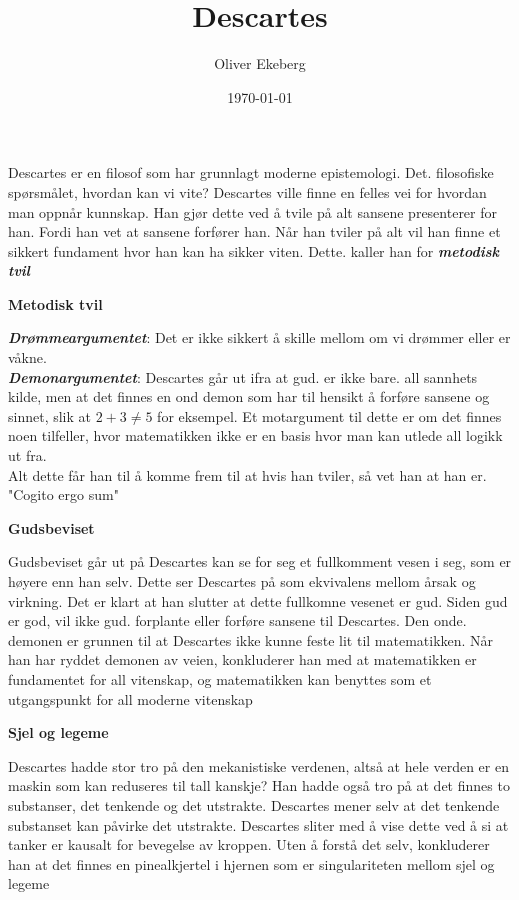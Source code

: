 \documentclass[11pt, a4paper]{article}
\title{Descartes}
\author{Oliver Ekeberg}
\date{\today}
\newenvironment{sectionbox}[1][]{%
    \begin{sectionboxinner}
    \textbf{\large #1}
    \vspace{1pt}
    \newline
}{%
    \end{sectionboxinner}
}
\begin{document}
\maketitle

\tableofcontents

Descartes er en filosof som har grunnlagt moderne epistemologi. Det. filosofiske spørsmålet, hvordan kan vi vite? Descartes ville finne en felles vei for hvordan man oppnår kunnskap. Han gjør dette ved å tvile på alt sansene presenterer for han. Fordi han vet at sansene forfører han. Når han tviler på alt vil han finne et sikkert fundament hvor han kan ha sikker viten. Dette. kaller han for \textbf{\textit{metodisk tvil}}

\begin{sectionbox}[Metodisk tvil]
\textbf{\textit{Drømmeargumentet}}: Det er ikke sikkert å skille mellom om vi drømmer eller er våkne. \\

\textbf{\textit{Demonargumentet}}: Descartes går ut ifra at gud. er ikke bare. all sannhets kilde, men at det finnes en ond demon som har til hensikt å forføre sansene og sinnet, slik at $ 2+3\neq 5  $ for eksempel. Et motargument til dette er om det finnes noen tilfeller, hvor matematikken ikke er en basis hvor man kan utlede all logikk ut fra.\\

Alt dette får han til å komme frem til at hvis han tviler, så vet han at han er. "Cogito ergo sum"

\end{sectionbox}


\begin{sectionbox}[Gudsbeviset]
Gudsbeviset går ut på Descartes kan se for seg et fullkomment vesen i seg, som er høyere enn han selv. Dette ser Descartes på som ekvivalens mellom årsak og virkning. Det er klart at han slutter at dette fullkomne vesenet er gud. Siden gud er god,  vil ikke gud. forplante eller forføre sansene til Descartes. Den onde. demonen er grunnen til at Descartes ikke kunne feste lit til matematikken. Når han har ryddet demonen av veien, konkluderer han med at matematikken er fundamentet for all vitenskap, og matematikken kan benyttes som et utgangspunkt for all moderne vitenskap
\end{sectionbox}


\begin{sectionbox}[Sjel og legeme]
Descartes hadde stor tro på den mekanistiske verdenen, altså at hele verden er en maskin som kan reduseres til tall kanskje? Han hadde også tro på at det finnes to substanser, det tenkende og det utstrakte. Descartes mener selv at det tenkende substanset kan påvirke det utstrakte. Descartes sliter med å vise dette ved å si at tanker er kausalt for bevegelse av kroppen. Uten å forstå det selv, konkluderer han at det finnes en pinealkjertel i hjernen som er singulariteten mellom sjel og legeme

\end{sectionbox}
\end{document}
